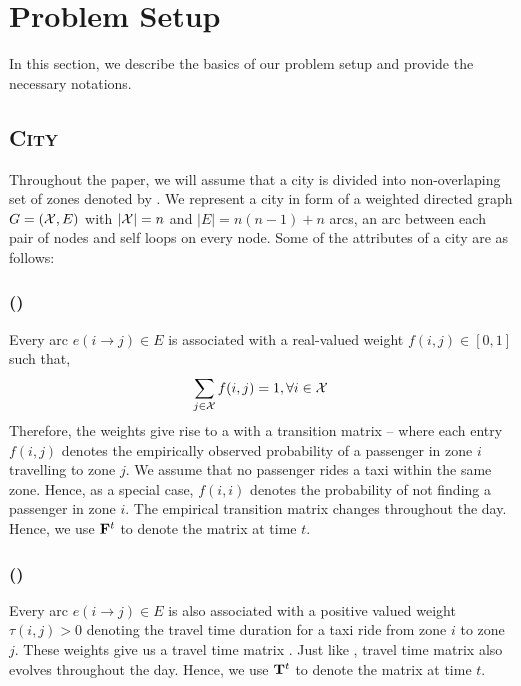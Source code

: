 
\section{Problem Setup}
\label{sec:problem_setup}

In this section, we describe the basics of our problem setup and provide the necessary notations.

\subsection{\textsc{City}}

Throughout the paper, we will assume that a city is divided into non-overlaping set of zones denoted by \cityzones. 
We represent a city in form of a weighted directed graph $G=(\mathcal{X}, E)$ with 
$|\mathcal{X}| = n$ and $|E| = n(n-1) + n$ arcs, an arc between each pair of nodes and self loops on every node. 
Some of the attributes of a city are as follows:

\subsubsection{ (\empiricaltransitionmatrix)}

Every arc $e(i\rightarrow j) \in E$ is associated with a real-valued weight $f(i,j) \in [0,1]$ such that,
\begin{equation}
	\sum_{j \in \mathcal{X}} f(i,j) = 1, \forall i \in \mathcal{X}
\end{equation}
Therefore, the weights give rise to a {\markovchain} with a transition matrix {\empiricaltransitionmatrix} -- 
where each entry $f(i,j)$ 
denotes the empirically observed probability of a passenger in zone $i$
travelling to zone $j$. We assume that no passenger rides a taxi within the same zone. Hence, as a special case, 
$f(i,i)$ denotes the probability of not finding a passenger in zone $i$. The empirical transition matrix {\empiricaltransitionmatrix}
changes throughout the day. Hence, we use ${\mathbf{F}}^t$ to denote the matrix at time $t$.

\subsubsection{ (\traveltimematrix)}

Every arc $e(i\rightarrow j) \in E$ is also associated with a positive valued weight $\tau(i,j) > 0$ 
denoting the travel time duration for a taxi ride from zone $i$ to zone $j$. 
These weights give us a travel time matrix {\traveltimematrix}. 
Just like {\empiricaltransitionmatrix},  travel time matrix also evolves throughout the day. 
Hence, we use ${\mathbf{T}}^t$ to denote the matrix at time $t$.

